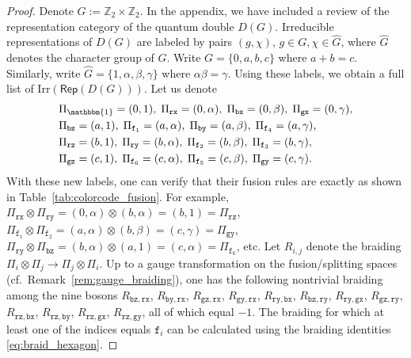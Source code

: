 \documentclass[a4paper,11pt]{article}
\theoremstyle{definition}
\theoremstyle{remark}
\theoremstyle{remark}
\newcommand\Rep {\mathsf{Rep}}
\newcommand\Irr {\mathrm{Irr}}
\newcommand{\one}{\mathbbm{1}}
\begin{document}
\begin{proof}
    Denote $G := \mathbb{Z}_2\times \mathbb{Z}_2$. In the appendix, we have included a review of the representation category of the quantum double $D(G)$. Irreducible representations of $D(G)$ are labeled by pairs $(g,\chi)$, $g\in G, \chi\in\widehat{G}$, where $\widehat{G}$ denotes the character group of $G$. 
    Write $G = \{0,a,b,c\}$ where $a+b=c$. Similarly, write $\widehat{G} = \{1,\alpha,\beta,\gamma\}$ where $\alpha\beta=\gamma$. 
    Using these labels, we obtain a full list of $\Irr(\Rep(D(G)))$. Let us denote 
    \begin{align*}
    	& \Pi_\one = (0,1),\; \Pi_{\mathtt{rx}} = (0,\alpha),\; \Pi_{\mathtt{bx}} = (0,\beta),\; \Pi_{\mathtt{gx}} = (0,\gamma), \\
    	& \Pi_{\mathtt{bz}} = (a,1),\; \Pi_{\mathtt{f}_1} = (a,\alpha),\; \Pi_{\mathtt{by}} = (a,\beta),\; \Pi_{\mathtt{f}_4} = (a,\gamma), \\
    	& \Pi_{\mathtt{rz}} = (b,1),\; \Pi_{\mathtt{ry}} = (b,\alpha),\; \Pi_{\mathtt{f}_2} = (b,\beta),\; \Pi_{\mathtt{f}_3} = (b,\gamma), \\
    	& \Pi_{\mathtt{gz}} = (c,1),\; \Pi_{\mathtt{f}_6} = (c,\alpha),\; \Pi_{\mathtt{f}_5} = (c,\beta),\; \Pi_{\mathtt{gy}} = (c,\gamma). 
    \end{align*}
    With these new labels, one can verify that their fusion rules are exactly as shown in Table~\ref{tab:colorcode_fusion}. 
    For example, $\Pi_{\mathtt{rx}}\otimes\Pi_{\mathtt{ry}} = (0,\alpha)\otimes(b,\alpha) = (b,1) = \Pi_{\mathtt{rz}}$, $\Pi_{\mathtt{f}_1}\otimes \Pi_{\mathtt{f}_2} = (a,\alpha)\otimes (b,\beta)  = (c,\gamma) = \Pi_{\mathtt{gy}}$, $\Pi_{\mathtt{ry}}\otimes \Pi_{\mathtt{bz}} = (b,\alpha)\otimes (a,1) = (c,\alpha) = \Pi_{\mathtt{f}_6}$, etc. 
    Let $R_{i,j}$ denote the braiding $\Pi_i\otimes \Pi_j\to \Pi_j\otimes \Pi_i$. Up to a gauge transformation on the fusion/splitting spaces (cf.~Remark~\ref{rem:gauge_braiding}), one has the following nontrivial braiding among the nine bosons $R_{\mathtt{bz},\mathtt{rx}}$, $R_{\mathtt{by},\mathtt{rx}}$, $R_{\mathtt{gz},\mathtt{rx}}$, $ R_{\mathtt{gy},\mathtt{rx}}$, $R_{\mathtt{ry},\mathtt{bx}}$, $R_{\mathtt{bz},\mathtt{ry}}$, $R_{\mathtt{ry},\mathtt{gx}}$, $R_{\mathtt{gz},\mathtt{ry}}$, $R_{\mathtt{rz},\mathtt{bx}}$, $R_{\mathtt{rz},\mathtt{by}}$, $R_{\mathtt{rz},\mathtt{gx}}$, $R_{\mathtt{rz},\mathtt{gy}}$, all of which equal $-1$. 
    The braiding for which at least one of the indices equals $\mathtt{f}_i$ can be calculated using the braiding identities \eqref{eq:braid_hexagon}.


\end{proof}
\end{document}
